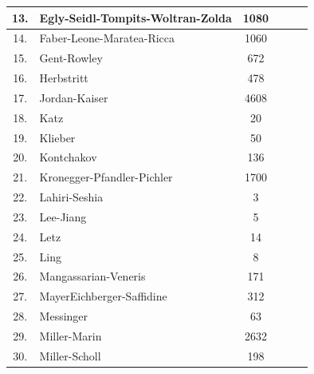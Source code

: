 \documentclass[runningheads]{llncs}
\begin{document}
\begin{table}
\begin{tabular}{c|l|c|c|c|c}
13. & Egly-Seidl-Tompits-Woltran-Zolda &  1080 &  &  &  \\ \hline

14. & Faber-Leone-Maratea-Ricca &  1060 &  &  &  \\ \hline

15. & Gent-Rowley &  672 &  &  &  \\ \hline

16. & Herbstritt &  478 & &  &  \\ \hline

17. & Jordan-Kaiser &  4608 & &  &  \\\hline

18. & Katz &  20 &  &  &  \\ \hline

19. & Klieber & 50 &  &  &  \\ \hline

20. & Kontchakov&  136 & &  &  \\ \hline

21. & Kronegger-Pfandler-Pichler &  1700 &  &   & \\ \hline

22. & Lahiri-Seshia & 3 & &  &  \\ \hline

23. & Lee-Jiang &  5 &  &  &  \\ \hline

24. & Letz & 14 &  &  &  \\\hline

25. & Ling &  8 & &  &  \\ \hline

26. & Mangassarian-Veneris &  171 & &  &  \\ \hline

27. & MayerEichberger-Saffidine &  312 & & & \\\hline

28. & Messinger &  63 & &  &  \\ \hline

29. & Miller-Marin & 2632 & &  &  \\ \hline

30. & Miller-Scholl & 198 & &  &  \\ \hline


\end{tabular}
\end{table}
\end{document}
